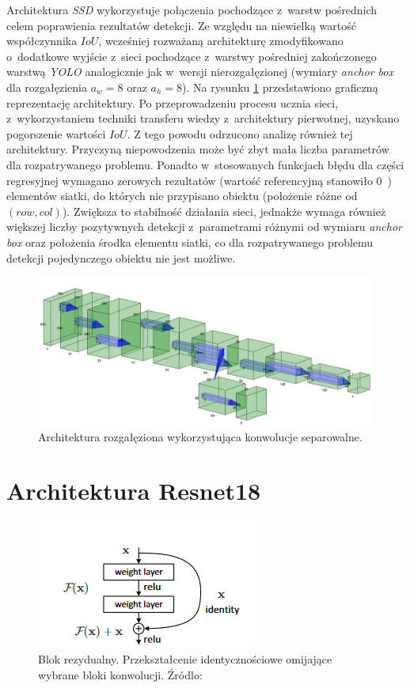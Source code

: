 Architektura \emph{SSD} wykorzystuje połączenia pochodzące z~warstw pośrednich celem poprawienia rezultatów detekcji.  
Ze względu na niewielką wartość współczynnika $IoU$, wcześniej rozważaną architekturę zmodyfikowano o~dodatkowe wyjście z~sieci pochodzące z~warstwy pośredniej zakończonego warstwą \emph{YOLO} analogicznie jak w~wersji nierozgałęzionej (wymiary \emph{anchor box} dla rozgałęzienia $a_w = 8$ oraz  $a_h = 8$). 
Na rysunku \ref{fig:arch_v2} przedstawiono graficzną reprezentację architektury. 
Po przeprowadzeniu procesu ucznia sieci, z~wykorzystaniem techniki transferu wiedzy z~architektury pierwotnej, uzyskano pogorszenie wartości $IoU$.
Z tego powodu odrzucono analizę również tej architektury.
Przyczyną niepowodzenia może być zbyt mała liczba parametrów dla rozpatrywanego problemu.
Ponadto w~stosowanych funkcjach błędu dla części regresyjnej wymagano zerowych rezultatów (wartość referencyjną stanowiło 0~) elementów siatki, do których nie przypisano obiektu (położenie różne od $(row,col)$).
Zwiększa to stabilność działania sieci, jednakże wymaga również większej liczby pozytywnych detekcji z~parametrami różnymi od wymiaru \emph{anchor box} oraz położenia środka elementu siatki, co dla rozpatrywanego problemu detekcji pojedynczego obiektu nie jest możliwe. 

\begin{figure}
    \centering
    \includegraphics[width=\linewidth]{images/Architektura_branched.png}
    \caption{Architektura rozgałęziona wykorzystująca konwolucje separowalne.}
    \label{fig:arch_v2}
\end{figure}


\section{Architektura Resnet18}

\begin{figure}
    \centering
    \includegraphics{images/residual.png}
    \caption{Blok rezydualny. Przekształcenie identycznościowe omijające wybrane bloki konwolucji. Źródlo: \cite{resnet18}}
    \label{fig:res_block}
\end{figure}

